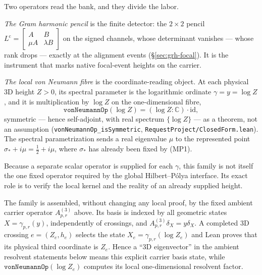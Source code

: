 Two operators read the bank, and they divide the labor.

\emph{The Gram harmonic pencil} is the finite detector: the \(2\times2\)
pencil
\(L^{\mathrm c}=\left[\begin{smallmatrix}A&B\\ \mu A&\lambda
B\end{smallmatrix}\right]\)
on the signed channels, whose determinant vanishes --- whose rank drops ---
exactly at the alignment events (\S\ref{sec:grh-focal}). It is the instrument
that marks native focal-event heights on the carrier.

\emph{The local von Neumann fibre} is the coordinate-reading object. At each
physical 3D height \(Z>0\), its spectral parameter is the logarithmic ordinate
\(\gamma=y=\log Z\), and it is multiplication by \(\log Z\) on the
one-dimensional fibre,
\[
\texttt{vonNeumannOp}(\log Z)=(\log Z:\mathbb C)\cdot\mathrm{id},
\]
symmetric --- hence self-adjoint, with real spectrum \(\{\log Z\}\) --- as a
theorem, not an assumption (\texttt{vonNeumannOp\_isSymmetric},
\texttt{RequestProject/ClosedForm.lean}). The spectral parametrization sends
a real eigenvalue \(\mu\) to the represented point
\(\sigma_*+i\mu=\tfrac12+i\mu\), where \(\sigma_*\) has already been fixed
by (MP1).

Because a separate scalar operator is supplied for each \(\gamma\), this family is
not itself the one fixed operator required by the global Hilbert--P\'olya
interface.  Its exact role is to verify the local kernel and the reality of an
already supplied height.

The family is assembled, without changing any local proof, by the fixed
ambient carrier operator \(A^{(3)}_{p,r}\) above.  Its basis is indexed by all
geometric states $X=\gamma_{p,r}(y)$, independently of crossings, and
\(A^{(3)}_{p,r}\delta_X=y\delta_X\).  A completed 3D crossing
$e=(Z_e,h_e)$ selects the state $X_e=\gamma_{p,r}(\log Z_e)$ and Lean proves
that its physical third coordinate is $Z_e$.  Hence a ``3D eigenvector'' in
the ambient resolvent statements below means this explicit carrier basis state, while
\(\texttt{vonNeumannOp}(\log Z_e)\) computes its local
one-dimensional resolvent factor.

